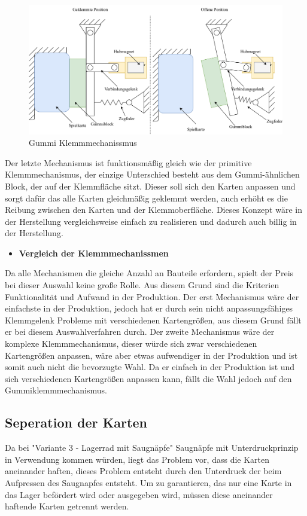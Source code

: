 \begin{figure}[H]
    \centering
    \includegraphics[scale=0.9,page=1]{fig/mech/Klemmmechanissmus3}
    \caption{Gummi Klemmmechanissmus}
\end{figure}

Der letzte Mechanismus ist funktionsmäßig gleich wie der primitive Klemmmechanismus, der einzige Unterschied besteht aus dem
Gummi-ähnlichen Block, der auf der Klemmfläche sitzt. Dieser soll sich den Karten anpassen und sorgt dafür das alle Karten gleichmäßig
geklemmt werden, auch erhöht es die Reibung zwischen den Karten und der Klemmoberfläche. Dieses Konzept wäre in der Herstellung vergleichsweise
einfach zu realisieren und dadurch auch billig in der Herstellung.


\begin{itemize}
    \item \textbf{Vergleich der Klemmmechanissmen}
\end{itemize}

Da alle Mechanismen die gleiche Anzahl an Bauteile erfordern, spielt der Preis bei dieser Auswahl keine große Rolle. Aus diesem Grund
sind die Kriterien Funktionalität und Aufwand in der Produktion. Der erst Mechanismus wäre der einfachste in der Produktion, jedoch
hat er durch sein nicht anpassungsfähiges Klemmgelenk Probleme mit verschiedenen Kartengrößen, aus diesem Grund fällt er bei diesem Auswahlverfahren durch.
Der zweite Mechanismus wäre der komplexe Klemmmechanismus, dieser würde sich zwar verschiedenen Kartengrößen anpassen, wäre aber etwas aufwendiger in der
Produktion und ist somit auch nicht die bevorzugte Wahl. Da er einfach in der Produktion ist und sich verschiedenen Kartengrößen anpassen kann, fällt die Wahl jedoch auf den Gummiklemmmechanismus.

\subsection{Seperation der Karten}
Da bei "Variante 3 - Lagerrad mit Saugnäpfe" Saugnäpfe mit Unterdruckprinzip in Verwendung kommen würden, liegt das Problem vor,
dass die Karten aneinander haften, dieses Problem entsteht durch den Unterdruck der beim Aufpressen des Saugnapfes entsteht.
Um zu garantieren, das nur eine Karte in das Lager befördert wird oder ausgegeben wird, müssen diese aneinander
haftende Karten getrennt werden.

